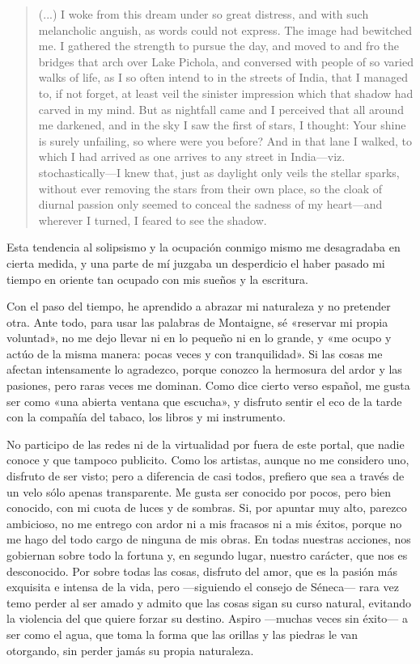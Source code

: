 \documentclass[a4paper, 12pt]{article}
\begin{document}
\begin{quote}
    (...) I woke from this dream under so great distress, and with such
melancholic anguish, as words could not express. The image had bewitched me. I
gathered the strength to pursue the day, and moved to and fro the bridges that
arch over Lake Pichola, and conversed with people of so varied walks of life, as
I so often intend to in the streets of India, that I managed to, if not forget,
at least veil the sinister impression which that shadow had carved in my mind.
But as nightfall came and I perceived that all around me darkened, and in the
sky I saw the first of stars, I thought: Your shine is surely unfailing, so
where were you before? And in that lane I walked, to which I had arrived as one
arrives to any street in India—viz. stochastically—I knew that, just as daylight
only veils the stellar sparks, without ever removing the stars from their own
place, so the cloak of diurnal passion only seemed to conceal the sadness of my
heart—and wherever I turned, I feared to see the shadow.
\end{quote}

Esta tendencia al solipsismo y la ocupación conmigo mismo me desagradaba en
cierta medida, y una parte de mí juzgaba un desperdicio el haber pasado mi
tiempo en oriente tan ocupado con mis sueños y la escritura.

Con el paso del tiempo, he aprendido a abrazar mi naturaleza y no pretender
otra. Ante todo, para usar las palabras de Montaigne, sé «reservar mi propia
voluntad», no me dejo llevar ni en lo pequeño ni en lo grande, y «me ocupo y actúo
de la misma manera: pocas veces y con tranquilidad». Si las cosas me afectan
intensamente lo agradezco, porque conozco la hermosura del ardor y las pasiones,
pero raras veces me dominan. Como dice cierto verso español, me gusta ser como
«una abierta ventana que escucha», y disfruto sentir el eco de la tarde con la
compañía del tabaco, los libros y mi instrumento.

No participo de las redes ni de la virtualidad por fuera de este portal, que
nadie conoce y que tampoco publicito. Como los artistas, aunque no me considero
uno, disfruto de ser visto; pero a diferencia de casi todos, prefiero que sea a
través de un velo sólo apenas transparente. Me gusta ser conocido por pocos,
pero bien conocido, con mi cuota de luces y de sombras. Si, por apuntar muy
alto, parezco ambicioso, no me entrego con ardor ni a mis fracasos ni a mis
éxitos, porque no me hago del todo cargo de ninguna de mis obras. En todas
nuestras acciones, nos gobiernan sobre todo la fortuna y, en segundo lugar,
nuestro carácter, que nos es desconocido. Por sobre todas las cosas, disfruto
del amor, que es la pasión más exquisita e intensa de la vida, pero ---siguiendo
el consejo de Séneca--- rara vez temo perder al ser amado y admito que las cosas
sigan su curso natural, evitando la violencia del que quiere forzar su destino.
Aspiro ---muchas veces sin éxito--- a ser como el agua, que toma la forma que
las orillas y las piedras le van otorgando, sin perder jamás su propia
naturaleza.
\end{document}
